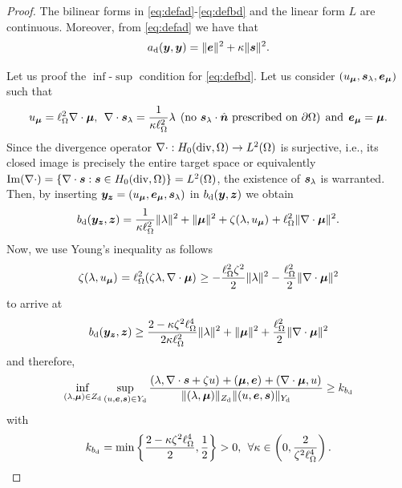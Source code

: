 \begin{proof}
The bilinear forms in \eqref{eq:defad}-\eqref{eq:defbd} and the linear form $L$ are continuous. Moreover, from \eqref{eq:defad} we have that
$$\ad(\yF,\yF) = \norm[]{\eF}^2+\kappa\norm[]{\sF}^2.$$

Let us proof the $\inf$-$\sup$ condition for \eqref{eq:defbd}. Let us consider $(\uF_{\mF},\sF_{\lF},\eF_{\mF})$ such that
$$\uF_{\mF} = \length^2\nabla\cdot\mF,\:\:
\nabla\cdot\sF_{\lF} = \frac{1}{\kappa\length^2}\lF\:\: (\textrm{no }\sF_{\lF}\cdot\normal\textrm{ prescribed on }\partial\Omega)
\:\:\mathrm{and}\:\:
\eF_{\mF} = \mF.$$
Since the divergence operator
$\nabla\cdot:\Hdivz\to\Ltwo$ is surjective, i.e., its closed image is precisely the entire target space or equivalently
$\Image(\nabla\cdot) = \left\lbrace\nabla\cdot\sF:\sF\in\Hdivz\right\rbrace= \Ltwo$, the existence of $\sF_{\lF}$ is warranted.
Then, by inserting
$\yF_{\zF} = (\uF_{\mF},\eF_{\mF},\sF_{\lF})$
in $\bd(\yF,\zF)$ we obtain
$$\bd(\yF_{\zF},\zF) =
\frac{1}{\kappa\length^2}\norm[]{\lF}^2
+\norm[]{\mF}^2
+\zeta\iprod[]{\lF}{\uF_{\mF}}
+\length^2\norm[]{\nabla\cdot\mF}^2.
$$
Now, we use Young's inequality as follows
$$
\zeta \iprod[]{\lF}{\uF_{\mF}} = 
\length^2\iprod[]{\zeta\lF}{\nabla\cdot\mF} \geq -\frac{\length^2\zeta^2}{2}\norm[]{\lF}^2-\frac{\length^2}{2}\norm[]{\nabla\cdot\mF}^2%
$$
to arrive at
$$\bd(\yF_{\zF},\zF) \geq
\frac{2-\kappa\zeta^2\length^4}{2\kappa\length^2}\norm[]{\lF}^2
+\norm[]{\mF}^2
+\frac{\length^2}{2}\norm[]{\nabla\cdot\mF}^2
$$
and therefore,
$$
\inf_{(\lF,\mF)\in \ZSd}\sup_{(\uF,\eF,\sF)\in \YSd}\frac{\iprod[]{\lF}{\nabla\cdot\sF+\zeta\uF}+\iprod[]{\mF}{\eF}+\iprod[]{\nabla\cdot\mF}{\uF}}{\norm[\ZSd]{(\lF,\mF)}\norm[\YSd]{(\uF,\eF,\sF)}}
\geq \kbd
$$
with 
$$\kbd = \min\left\lbrace \frac{2-\kappa\zeta^2\length^4}{2}, \frac12\right\rbrace > 0,\:\:\forall\kappa\in\left(0,\frac{2}{\zeta^2\length^4}\right).$$
%


\end{proof}

